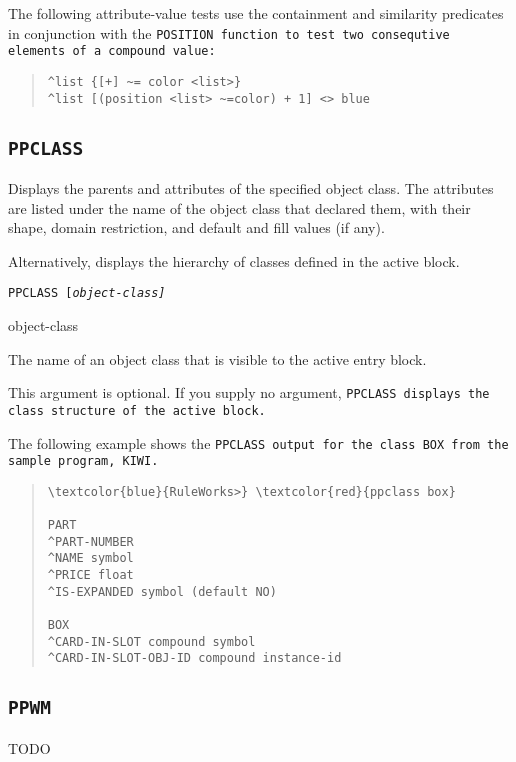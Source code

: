 {{The following attribute-value tests use the containment and
similarity predicates in conjunction with the \tt{POSITION}
function to test two consequtive elements of a compound
value:
\begin{quote}
\begin{verbatim}
^list {[+] ~= color <list>}
^list [(position <list> ~=color) + 1] <> blue
\end{verbatim}
\end{quote}


\subsection{\tt{PPCLASS}}

Displays the parents and attributes of the specified object class. The
attributes are listed under the name of the object class that declared
them, with their shape, domain restriction, and default and fill
values (if any).

Alternatively, displays the hierarchy of classes defined in the active
block.

\Format

\tt{PPCLASS} [\it{object-class}]

\begin{arguments}
\item[object-class]

  The name of an object class that is visible to the active entry
  block.

  This argument is optional. If you supply no argument, \tt{PPCLASS}
  displays the class structure of the active block.
\end{arguments}

\Example

The following example shows the \tt{PPCLASS} output for the class
\tt{BOX} from the sample program, \tt{KIWI}.

\begin{quote}
\begin{Verbatim}[commandchars=\\\{\}]
\textcolor{blue}{RuleWorks>} \textcolor{red}{ppclass box}

PART
^PART-NUMBER
^NAME symbol
^PRICE float
^IS-EXPANDED symbol (default NO)

BOX
^CARD-IN-SLOT compound symbol
^CARD-IN-SLOT-OBJ-ID compound instance-id
\end{Verbatim}
\end{quote}

\subsection{\tt{PPWM}}
TODO

}}
